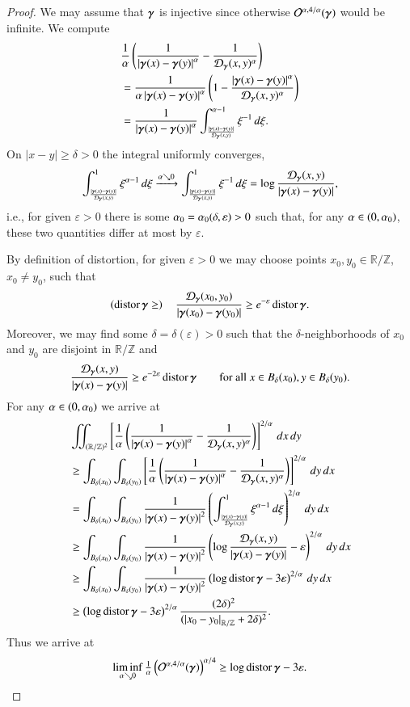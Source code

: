 \documentclass[a4paper,10pt,intlimits,ngerman]{amsart}
\numberwithin{equation}{section}
\newcommand{\R}{\mathbb{R}}
\newcommand{\Z}{\mathbb{Z}}
\newcommand{\abs}[1]{\left | #1 \right |}
\newcommand{\eps}{\varepsilon}
\DeclareMathOperator{\distor}{distor}
\begin{document}
\begin{proof}
 We may assume that ${\boldsymbol{\gamma}}$ is injective since otherwise
 $\mathcal{O}^{\alpha,4/\alpha}({\boldsymbol{\gamma}})$ would be infinite.
 We compute
 \begin{align*}
  &\frac1\a\br{\frac1{\abs{\D}^{\a}}-\frac1{\mathcal{D}_{\g}(x,y)^{\a}}} \\
  &=\frac1{\a\abs{\D}^{\a}}\br{1-\frac{\abs{\D}^{\a}}{\mathcal{D}_{\g}(x,y)^{\a}}} \\
  &=\frac1{\abs{\D}^{\a}}\int_{\frac{\abs{\D}}{\mathcal{D}_{\g}(x,y)}}^{\a-1}\xi^{-1}\d\xi.
 \end{align*}
 On $|x-y|\ge\delta>0$ the integral uniformly converges,
 \[ \int_{\frac{\abs{\D}}{\mathcal{D}_{\g}(x,y)}}^{1}\xi^{\a-1}\d\xi
 \xrightarrow{\a\searrow0} \int_{\frac{\abs{\D}}{\mathcal{D}_{\g}(x,y)}}^{1}\xi^{-1}\d\xi
 = \log\frac{\mathcal{D}_{\g}(x,y)}{\abs{\D}}, \]
 i.e., for given $\eps>0$ there is some $\a_{0}=\a_{0}(\delta,\eps)>0$ such
 that, for any $\alpha\in(0,\alpha_{0})$, these two quantities
 differ at most by $\eps$.
 
 By definition of distortion, for given $\eps>0$ we may choose points $x_{0},y_{0}\in\R/\Z$,
 $x_{0}\ne y_{0}$, such that
 \[ \br{\distor\g\ge}\quad \frac{\mathcal{D}_{\g}(x_{0},y_{0})}{\abs{\g(x_0)-\g(y_{0})}}
 \ge e^{-\eps}\distor\g. \]
 Moreover, we may find some $\delta=\delta(\eps)>0$
 such that the $\delta$-neighborhoods of $x_{0}$ and $y_{0}$
 are disjoint in $\R/\Z$ and
 \[ \frac{\mathcal{D}_{\g}(x,y)}{\abs{\g(x)-\g(y)}}
 \ge e^{-2\eps}\distor\g
 \qquad\text{for all }x\in B_{\delta}(x_{0}), y\in B_{\delta}(y_{0}). \]
 For any $\alpha\in(0,\alpha_{0})$ we arrive at
 \begin{align*}
  &\iint_{(\R/\Z)^{2}}\sq{\frac1\a\br{\frac1{\abs{\g(x)-\g(y)}^{\a}}-\frac1{\mathcal{D}_{\g}(x,y)^{\a}}}}^{2/\a}\d x\d y \\
  &\ge\int_{B_\delta(x_{0})}\int_{B_\delta(y_{0})}\sq{\frac1\a\br{\frac1{\abs{\g(x)-\g(y)}^{\a}}-\frac1{\mathcal{D}_{\g}(x,y)^{\a}}}}^{2/\a}\d y\d x \\
  &=\int_{B_\delta(x_{0})}\int_{B_\delta(y_{0})}\frac1{\abs{\g(x)-\g(y)}^{2}}\br{\int_{\frac{\abs{\D}}{\mathcal{D}_{\g}(x,y)}}^{1}\xi^{\a-1}\d\xi}^{2/\a}\d y\d x \\
  &\ge\int_{B_\delta(x_{0})}\int_{B_\delta(y_{0})}\frac1{\abs{\g(x)-\g(y)}^{2}}\br{\log\frac{\mathcal{D}_{\g}(x,y)}{\abs{\g(x)-\g(y)}}-\eps}^{2/\a}\d y\d x \\
  &\ge\int_{B_\delta(x_{0})}\int_{B_\delta(y_{0})}\frac1{\abs{\g(x)-\g(y)}^{2}}\br{\log\distor\g-3\eps}^{2/\a}\d y\d x \\
  &\ge\br{\log\distor\g-3\eps}^{2/\a}\frac{(2\delta)^{2}}{(\abs{x_{0}-y_{0}}_{\R/\Z}+2\delta)^{2}}.
 \end{align*}
 Thus we arrive at
 \[ \liminf_{\a\searrow0}\tfrac1\a\br{\E(\g)}^{\a/4} \ge\log\distor\g-3\eps. \]
\end{proof}
\end{document}
